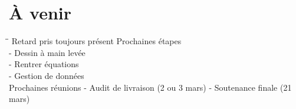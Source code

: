 \documentclass{beamer}
\begin{document}

\section{À venir}

\begin{frame}{\secname}
	
	\begin{tabbing}
	\hspace{1cm}\=\hspace{2cm}\=\kill
		Retard pris toujours pr\'esent %
		Prochaines \'etapes\\
			\> - Dessin à main lev\'ee\\
			\> - Rentrer \'equations\\
			\> - Gestion de donn\'ees\\
		
		Prochaines r\'eunions 
		 \> - Audit de livraison (2 ou 3 mars)
		 \> - Soutenance finale (21 mars)
		 
		
	\end{tabbing}
	
	
\end{frame}
\end{document}
